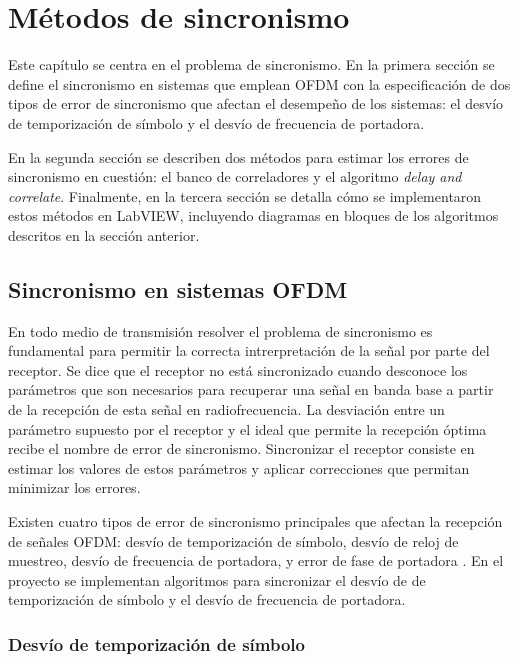 \chapter{Métodos de sincronismo}
\label{Ch:3}
\graphicspath{{figs/}}

Este capítulo se centra en el problema de sincronismo. En la primera sección se define el sincronismo en sistemas que emplean OFDM con la especificación de dos tipos de error de sincronismo que afectan el desempeño de los sistemas: el desvío de temporización de símbolo y el desvío de frecuencia de portadora. 

En la segunda sección se describen dos métodos para estimar los errores de sincronismo en cuestión: el banco de correladores y el algoritmo \textit{delay and correlate}. Finalmente, en la tercera sección se detalla cómo se implementaron estos métodos en LabVIEW, incluyendo diagramas en bloques de los algoritmos descritos en la sección anterior.

\section{Sincronismo en sistemas OFDM}
\label{S:ch3-sincronismo}

En todo medio de transmisión resolver el problema de sincronismo es fundamental para permitir la correcta intrerpretación de la señal por parte del receptor. Se dice que el receptor no está sincronizado cuando desconoce los parámetros que son necesarios para recuperar una señal en banda base a partir de la recepción de esta señal en radiofrecuencia. La desviación entre un parámetro supuesto por el receptor y el ideal que permite la recepción óptima recibe el nombre de error de sincronismo. Sincronizar el receptor consiste en estimar los valores de estos parámetros y aplicar correcciones que permitan minimizar los errores.

Existen cuatro tipos de error de sincronismo principales que afectan la recepción de señales OFDM: desvío de temporización de símbolo, desvío de reloj de muestreo, desvío de frecuencia de portadora, y error de fase de portadora \cite{chiueh}. En el proyecto se implementan algoritmos para sincronizar el desvío de de temporización de símbolo y el desvío de frecuencia de portadora.

\subsection{Desvío de temporización de símbolo}
\label{Ss:ch3-sincronismo-tiempo}

